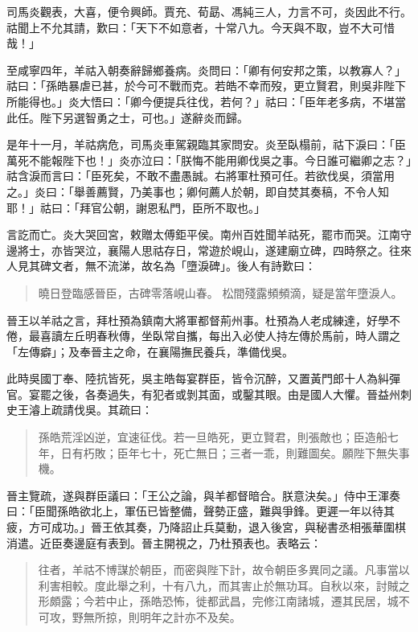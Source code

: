 司馬炎觀表，大喜，便令興師。賈充、荀勗、馮純三人，力言不可，炎因此不行。祜聞上不允其請，歎曰：「天下不如意者，十常八九。今天與不取，豈不大可惜哉！」

至咸寧四年，羊祜入朝奏辭歸鄉養病。炎問曰：「卿有何安邦之策，以教寡人？」祜曰：「孫皓暴虐已甚，於今可不戰而克。若皓不幸而歿，更立賢君，則吳非陛下所能得也。」炎大悟曰：「卿今便提兵往伐，若何？」祜曰：「臣年老多病，不堪當此任。陛下另選智勇之士，可也。」遂辭炎而歸。

是年十一月，羊祜病危，司馬炎車駕親臨其家問安。炎至臥榻前，祜下淚曰：「臣萬死不能報陛下也！」炎亦泣曰：「朕悔不能用卿伐吳之事。今日誰可繼卿之志？」祜含淚而言曰：「臣死矣，不敢不盡愚誠。右將軍杜預可任。若欲伐吳，須當用之。」炎曰：「舉善薦賢，乃美事也；卿何薦人於朝，即自焚其奏稿，不令人知耶！」祜曰：「拜官公朝，謝恩私門，臣所不取也。」

言訖而亡。炎大哭回宮，敕贈太傅鉅平侯。南州百姓聞羊祜死，罷市而哭。江南守邊將士，亦皆哭泣，襄陽人思祜存日，常遊於峴山，遂建廟立碑，四時祭之。往來人見其碑文者，無不流涕，故名為「墮淚碑」。後人有詩歎曰：

\begin{quote}
曉日登臨感晉臣，古碑零落峴山春。
松間殘露頻頻滴，疑是當年墮淚人。
\end{quote}

晉王以羊祜之言，拜杜預為鎮南大將軍都督荊州事。杜預為人老成練達，好學不倦，最喜讀左丘明春秋傳，坐臥常自攜，每出入必使人持左傳於馬前，時人謂之「左傳癖」；及奉晉主之命，在襄陽撫民養兵，準備伐吳。

此時吳國丁奉、陸抗皆死，吳主皓每宴群臣，皆令沉醉，又置黃門郎十人為糾彈官。宴罷之後，各奏過失，有犯者或剝其面，或鑿其眼。由是國人大懼。晉益州刺史王濬上疏請伐吳。其疏曰：

\begin{quote}
孫皓荒淫凶逆，宜速征伐。若一旦皓死，更立賢君，則張敵也；臣造船七年，日有朽敗；臣年七十，死亡無日；三者一乖，則難圖矣。願陛下無失事機。
\end{quote}

晉主覽疏，遂與群臣議曰：「王公之論，與羊都督暗合。朕意決矣。」侍中王渾奏曰：「臣聞孫皓欲北上，軍伍已皆整備，聲勢正盛，難與爭鋒。更遲一年以待其疲，方可成功。」晉王依其奏，乃降詔止兵莫動，退入後宮，與秘書丞相張華圍棋消遣。近臣奏邊庭有表到。晉主開視之，乃杜預表也。表略云：

\begin{quote}
往者，羊祜不博謀於朝臣，而密與陛下計，故令朝臣多異同之議。凡事當以利害相較。度此舉之利，十有八九，而其害止於無功耳。自秋以來，討賊之形頗露；今若中止，孫皓恐怖，徙都武昌，完修江南諸城，遷其民居，城不可攻，野無所掠，則明年之計亦不及矣。
\end{quote}

